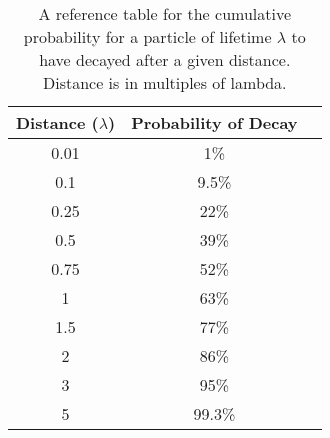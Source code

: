 
\begin{table}
\begin{center}
\begin{tabular}{ccc}
Distance ($\lambda$) &  Probability of Decay  \\
\hline
0.01               & 1\%                        \\
0.1                & 9.5\%                      \\              
0.25               & 22\%                       \\            
0.5                & 39\%                       \\          
0.75               & 52\%                       \\        
1                  & 63\%                       \\      
1.5                & 77\%                       \\    
2                  & 86\%                       \\  
3                  & 95\%                       \\
5                  & 99.3\%                     \\
\end{tabular}
\end{center}
\caption{ A reference table for the cumulative probability for a particle of lifetime $\lambda$ to have decayed after a given
distance. Distance is in multiples of lambda.}
\label{tab:lifetime}
\end{table}
